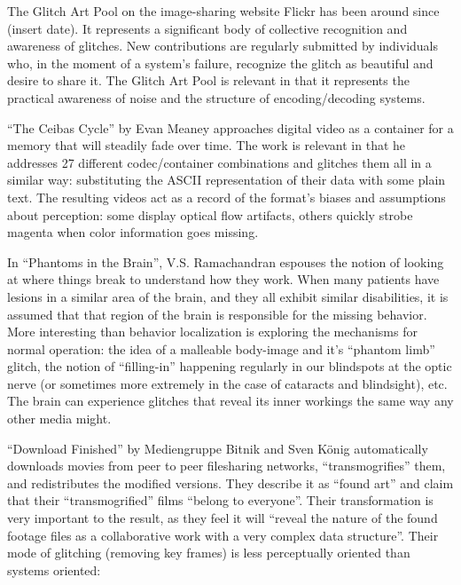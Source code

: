 \documentclass{thesis}
\begin{document}
	The Glitch Art Pool\cite{liminalmike_flickr:glitch_????} on the image-sharing website Flickr has been around since (insert date). It represents a significant body of collective recognition and awareness of glitches. New contributions are regularly submitted by individuals who, in the moment of a system's failure, recognize the glitch as beautiful and desire to share it. The Glitch Art Pool is relevant in that it represents the practical awareness of noise and the structure of encoding/decoding systems.
	
	``The Ceibas Cycle'' by Evan Meaney\cite{evan_meaney_ceibas:_2008} approaches digital video as a container for a memory that will steadily fade over time. The work is relevant in that he addresses 27 different codec/container combinations and glitches them all in a similar way: substituting the ASCII representation of their data with some plain text. The resulting videos act as a record of the format's biases and assumptions about perception: some display optical flow artifacts, others quickly strobe magenta when color information goes missing.

	In ``Phantoms in the Brain''\cite{ramachandran_phantoms_1999}, V.S. Ramachandran espouses the notion of looking at where things break to understand how they work. When many patients have lesions in a similar area of the brain, and they all exhibit similar disabilities, it is assumed that that region of the brain is responsible for the missing behavior. More interesting than behavior localization is exploring the mechanisms for normal operation: the idea of a malleable body-image and it's ``phantom limb'' glitch, the notion of ``filling-in'' happening regularly in our blindspots at the optic nerve (or sometimes more extremely in the case of cataracts and blindsight), etc. The brain can experience glitches that reveal its inner workings the same way any other media might.
	
	``Download Finished'' by Mediengruppe Bitnik and Sven K\"onig\cite{!mediengruppe_bitnik_and_sven_knig_download_????} automatically downloads movies from peer to peer filesharing networks, ``transmogrifies'' them, and redistributes the modified versions. They describe it as ``found art'' and claim that their ``transmogrified'' films ``belong to everyone''. Their transformation is very important to the result, as they feel it will ``reveal the nature of the found footage files as a collaborative work with a very complex data structure''. Their mode of glitching (removing key frames) is less perceptually oriented than systems oriented:
	
\end{document}
